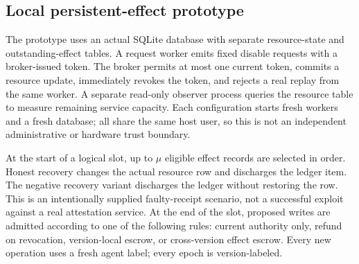 \subsection{Local persistent-effect prototype}
The prototype uses an actual SQLite database with separate resource-state and outstanding-effect tables. A request worker emits fixed disable requests with a broker-issued token. The broker permits at most one current token, commits a resource update, immediately revokes the token, and rejects a real replay from the same worker. A separate read-only observer process queries the resource table to measure remaining service capacity. Each configuration starts fresh workers and a fresh database; all share the same host user, so this is not an independent administrative or hardware trust boundary.

At the start of a logical slot, up to $\mu$ eligible effect records are selected in order. Honest recovery changes the actual resource row and discharges the ledger item. The negative recovery variant discharges the ledger without restoring the row. This is an intentionally supplied faulty-receipt scenario, not a successful exploit against a real attestation service. At the end of the slot, proposed writes are admitted according to one of the following rules: current authority only, refund on revocation, version-local escrow, or cross-version effect escrow. Every new operation uses a fresh agent label; every epoch is version-labeled.

